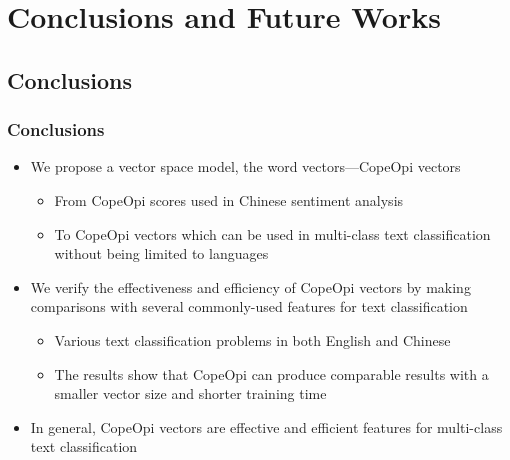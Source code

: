 \documentclass[mathserif]{beamer}
\begin{document}
\section{Conclusions and Future Works}
\subsection{Conclusions}
\begin{frame}
\frametitle{Conclusions}
	\begin{itemize}
	\item We propose a vector space model, the word vectors---CopeOpi vectors
		\begin{itemize}
		\item From CopeOpi scores used in Chinese sentiment analysis
		\item To CopeOpi vectors which can be used in multi-class text classification without being limited to languages
		\end{itemize}
	\item We verify the effectiveness and efficiency of CopeOpi vectors by making comparisons with several commonly-used features for text classification
		\begin{itemize}
		\item Various text classification problems in both English and Chinese 
		\item The results show that CopeOpi can produce comparable results with a smaller vector size and shorter training time
		\end{itemize}
	\item In general, CopeOpi vectors are effective and efficient features for multi-class text classification
	\end{itemize}
\end{frame}
\end{document}
